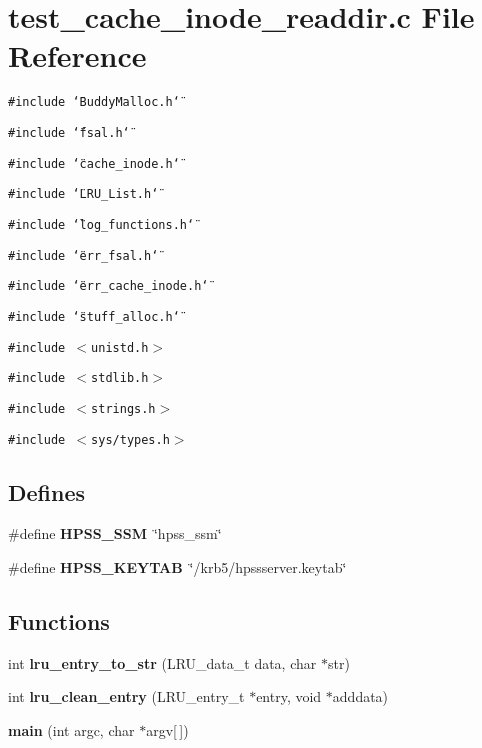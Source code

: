 \section{test\_\-cache\_\-inode\_\-readdir.c File Reference}
\label{test__cache__inode__readdir_8c}
{\tt \#include \char`\"{}Buddy\-Malloc.h\char`\"{}}\par
{\tt \#include \char`\"{}fsal.h\char`\"{}}\par
{\tt \#include \char`\"{}cache\_\-inode.h\char`\"{}}\par
{\tt \#include \char`\"{}LRU\_\-List.h\char`\"{}}\par
{\tt \#include \char`\"{}log\_\-functions.h\char`\"{}}\par
{\tt \#include \char`\"{}err\_\-fsal.h\char`\"{}}\par
{\tt \#include \char`\"{}err\_\-cache\_\-inode.h\char`\"{}}\par
{\tt \#include \char`\"{}stuff\_\-alloc.h\char`\"{}}\par
{\tt \#include $<$unistd.h$>$}\par
{\tt \#include $<$stdlib.h$>$}\par
{\tt \#include $<$strings.h$>$}\par
{\tt \#include $<$sys/types.h$>$}\par
\subsection*{Defines}
\begin{CompactItemize}
\item 
\#define {\bf HPSS\_\-SSM}\ \char`\"{}hpss\_\-ssm\char`\"{}
\item 
\#define {\bf HPSS\_\-KEYTAB}\ \char`\"{}/krb5/hpssserver.keytab\char`\"{}
\end{CompactItemize}
\subsection*{Functions}
\begin{CompactItemize}
\item 
int {\bf lru\_\-entry\_\-to\_\-str} (LRU\_\-data\_\-t data, char $\ast$str)
\item 
int {\bf lru\_\-clean\_\-entry} (LRU\_\-entry\_\-t $\ast$entry, void $\ast$adddata)
\item 
{\bf main} (int argc, char $\ast$argv[$\,$])
\end{CompactItemize}


